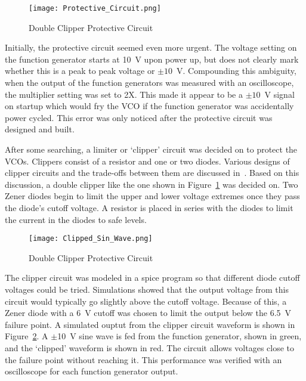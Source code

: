 \begin{figure}[ht]
\centering
\texttt{[image: Protective\_Circuit.png]}
\caption{Double Clipper Protective Circuit}

\label{fig:Clipper}

\end{figure}


 Initially, the protective circuit seemed even more urgent. The voltage setting on the function generator starts at 10~V upon power up, but does not clearly mark whether this is a peak to peak voltage or $\pm10$~V. Compounding this ambiguity, when the output of the function generators was measured with an oscilloscope, the multiplier setting was set to 2X. This made it appear to be a $\pm10$~V signal on startup which would fry the VCO if the function generator was accidentally power cycled. This error was only noticed after the protective circuit was designed and built. 

After some searching, a limiter or `clipper' circuit was decided on to protect the VCOs. Clippers consist of a resistor and one or two diodes. Various designs of clipper circuits and the trade-offs between them are discussed in~\cite{sedra_microelectronic_2015}. Based on this discussion, a double clipper like the one shown in Figure~\ref{fig:Clipper} was decided on. Two Zener diodes begin to limit the upper and lower voltage extremes once they pass the diode's cutoff voltage. A resistor is placed in series with the diodes to limit the current in the diodes to safe levels. 
\begin{figure}[ht]
\centering
\texttt{[image: Clipped\_Sin\_Wave.png]}
\caption{Double Clipper Protective Circuit}

\label{fig:Clipped_Sin}

\end{figure}

The clipper circuit was modeled in a spice program so that different diode cutoff voltages could be tried. Simulations showed that the output voltage from this circuit would typically go slightly above the cutoff voltage. Because of this, a Zener diode with a 6~V cutoff was chosen to limit the output below the 6.5~V failure point. A simulated ouptut from the clipper circuit waveform is shown in Figure~\ref{fig:Clipped_Sin}. A $\pm$10~V sine wave is fed from the function generator, shown in green, and the `clipped' waveform is shown in red. The circuit allows voltages close to the failure point without reaching it. This performance was verified with an oscilloscope for each function generator output.


